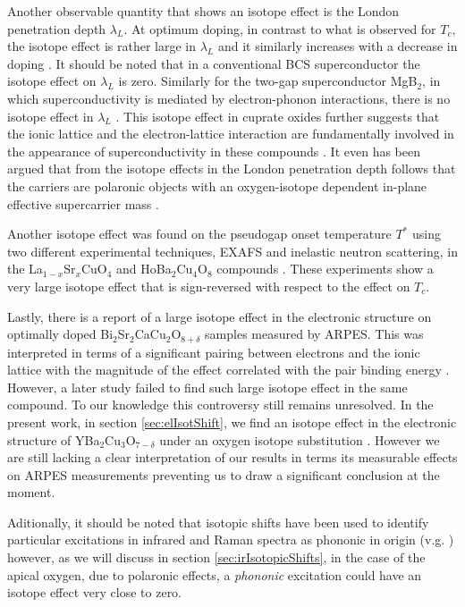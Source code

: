 Another observable quantity that shows an isotope effect is the London penetration depth $\lambda_L$.
At optimum doping, in contrast to what is observed for $T_c$, the isotope effect is rather large in $\lambda_L$ and it similarly increases with a decrease in doping \cite{Zhao1997,Hofer2000,Khasanov2004}.
It should be noted that in a conventional BCS superconductor the isotope effect on $\lambda_L$ is zero.
Similarly for the two-gap superconductor MgB$_2$, in which superconductivity is mediated by electron-phonon interactions, there is no isotope effect in $\lambda_L$ \cite{Castro2004}.
This isotope effect in cuprate oxides further suggests that the ionic lattice and the electron-lattice interaction are fundamentally involved in the appearance of superconductivity in these compounds \cite{Kresin2009}.
It even has been argued that from the isotope effects in the London penetration depth follows that the carriers are polaronic objects with an oxygen-isotope dependent in-plane effective supercarrier mass \cite{Zhao1997,Hofer2000,Khasanov2004}.

Another isotope effect was found on the pseudogap onset temperature $T^*$ using two different experimental techniques, EXAFS and inelastic neutron scattering, in the La$_{1-x}$Sr$_x$CuO$_4$ and HoBa$_2$Cu$_4$O$_8$ compounds \cite{Lanzara1999,RubioTemprano2000}.
These experiments show a very large isotope effect that is sign-reversed with respect to the effect on $T_c$.

Lastly, there is a report of a large isotope effect in the electronic structure on optimally doped Bi$_2$Sr$_2$CaCu$_2$O$_{8+\delta}$ samples measured by ARPES. 
This was interpreted in terms of a significant pairing between electrons and the ionic lattice with the magnitude of the effect correlated with the pair binding energy \cite{Gweon2004}.
However, a later study failed to find such large isotope effect \cite{Douglas2007} in the same compound.
To our knowledge this controversy still remains unresolved.
In the present work, in section \ref{sec:elIsotShift}, we find an isotope effect in the electronic structure of YBa$_2$Cu$_3$O$_{7-\delta}$ under an oxygen isotope substitution \cite{GarciaSaraviaOrtizdeMontellano2014}.
However we are still lacking a clear interpretation of our results in terms its measurable effects on ARPES measurements preventing us to draw a significant conclusion at the moment.

Aditionally, it should be noted that isotopic shifts have been used to identify particular excitations in infrared and Raman spectra as phononic in origin (v.g. \cite{Thomsen1990}) however, as we will discuss in section \ref{sec:irIsotopicShifts}, in the case of the apical oxygen, due to polaronic effects, a \textit{phononic} excitation could have an isotope effect very close to zero.
